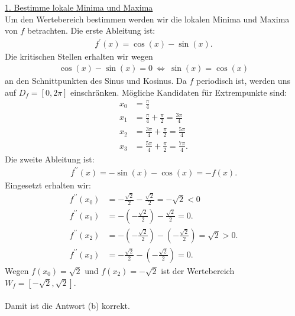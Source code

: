 \underline{1. Bestimme lokale Minima und Maxima}\\
Um den Wertebereich bestimmen werden wir  die lokalen Minima und Maxima von $ f $ betrachten. Die erste Ableitung ist:
\begin{align*}
	f^\prime(x) = \cos(x) - \sin(x).
\end{align*}
Die kritischen Stellen erhalten wir wegen
\begin{align*}
	\cos(x) - \sin(x) = 0 \ \Leftrightarrow \
	\sin(x) = \cos(x)
\end{align*}
an den Schnittpunkten des Sinus und Kosinus. Da $ f $ periodisch ist, werden uns auf $ D_f = [0,2\pi] $ einschränken.
Mögliche Kandidaten für Extrempunkte sind:
\begin{align*}
	x_0 &= \frac{\pi}{4}\\
	x_1 &= \frac{\pi}{4} + \frac{\pi}{2} = \frac{3 \pi}{4}\\
	x_2 &= \frac{3 \pi }{4} + \frac{\pi}{2} = \frac{5 \pi}{4}\\
	x_3 &= \frac{5 \pi}{4}+ \frac{\pi}{2} = \frac{7 \pi}{4}.
\end{align*}
Die zweite Ableitung ist:
\begin{align*}
	f^{\prime \prime} (x) = -\sin(x) - \cos(x) = -f(x). 
\end{align*}
Eingesetzt erhalten wir:
\begin{align*}
	f^{\prime \prime} (x_0) &= -\frac{\sqrt{2}}{2} - \frac{\sqrt{2}}{2} = -\sqrt{2} < 0\\
	f^{\prime \prime} (x_1) &= -\left(-\frac{\sqrt{2}}{2}\right) - \frac{\sqrt{2}}{2} = 0.\\
	f^{\prime \prime} (x_2) &= -\left(-\frac{\sqrt{2}}{2}\right) - \left(-\frac{\sqrt{2}}{2}\right) = \sqrt{2} >0.\\
	f^{\prime \prime} (x_3) &= -\frac{\sqrt{2}}{2} -\left(- \frac{\sqrt{2}}{2}\right) = 0.
\end{align*}
Wegen $ f(x_0) = \sqrt{2} $ und $ f(x_2) = -\sqrt{2} $ ist der Wertebereich $ W_f = [-\sqrt{2}, \sqrt{2}] $.\\
\\
Damit ist die Antwort (b) korrekt.

\newpage

